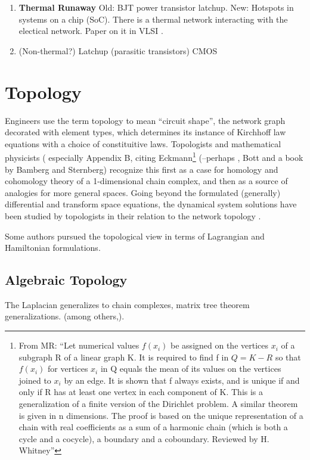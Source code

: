 \documentclass{article}
\begin{document}
\begin{enumerate}
\item
\textbf{Thermal Runaway} Old: BJT power transistor latchup.  New: Hotspots 
in systems on a chip (SoC). There is a thermal network interacting with the 
electical network. Paper on it in VLSI \cite{ThermalVLSI}.

\item (Non-thermal?) Latchup (parasitic transistors) 
CMOS\cite{CMOSLatchUpTINote}

\end{enumerate}

\section{Topology}

Engineers use the term topology to  mean ``circuit shape'', 
the network graph decorated with element types, which determines
its instance of Kirchhoff law equations with a choice of constituitive laws.
Topologists and mathematical physicists (\cite{Frankel} especially Appendix
B, citing 
Eckmann\footnote{
From MR: ``Let numerical values $f(x_i)$ be assigned on the vertices
$x_i$ of a subgraph R of a linear graph K. It is required to find f in
$Q=K−R$ so that $f(x_i)$ for vertices $x_i$ in Q equals the mean of
its values on the vertices joined to $x_i$ by an edge. It is shown
that f always exists, and is unique if and only if R has at least one
vertex in each component of K. This is a generalization of a finite
version of the Dirichlet problem. A similar theorem is given in n
dimensions. The proof is based on the unique representation of a chain
with real coefficients as a sum of a harmonic chain (which is both a
cycle and a cocycle), a boundary and a coboundary.  Reviewed by
H. Whitney''}
(\cite{Eckmann}--perhaps \cite{EckmannWorks}, 
Bott\cite{BottInducedRep} and a book by Bamberg and 
Sternberg\cite{BambergSternbergBookII})
recognize this first as a case for homology and cohomology theory of a 
1-dimensional chain complex, and then as a source of analogies for more 
general spaces.  Going beyond the formulated (generally) differential 
and transform space equations, the dynamical system solutions have been
studied by topologists in their relation to the network topology
\cite{MathFoundElecSmale}.
   
Some authors pursued the topological view in terms of 
Lagrangian and Hamiltonian formulations\cite{ChuaMcPhersonLagrange}.

\subsection{Algebraic Topology}
The Laplacian generalizes to chain complexes, matrix tree theorem
generalizations.
(among others,\cite{Frankel,DuvalKlivansMartin}).
\end{document}
